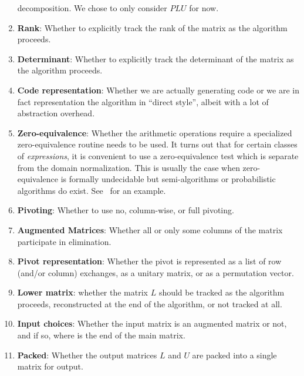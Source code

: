 \documentclass[draft]{elsart}
\begin{document}
\begin{enumerate}
		decomposition.  We chose to only consider $PLU$ for now.
	\item \textbf{Rank}: Whether to explicitly track the rank of the matrix
		as the algorithm proceeds.
	\item \textbf{Determinant}:  Whether to explicitly track the determinant
		of the matrix as the algorithm proceeds.
	\item \textbf{Code representation}: Whether we are actually generating
		code or we are in fact representation the algorithm in ``direct
		style'', albeit with a lot of abstraction overhead.
	\item \textbf{Zero-equivalence}: Whether the 
		arithmetic operations require a specialized zero-equivalence 
		routine needs to be used.  It turns out that for certain classes
		of \emph{expressions}, it is convenient to use a zero-equivalence
		test which is separate from the domain normalization.  This is
		usually the case when zero-equivalence is formally undecidable
		but semi-algorithms or probabilistic algorithms do exist.
		See~\cite{ZhCaJeMo06a} for an example.
    \item \textbf{Pivoting}: Whether to use no, 
        column-wise, or full pivoting.
    \item \textbf{Augmented Matrices}: Whether all or only some
      columns of the matrix participate in elimination.
	\item \textbf{Pivot representation}: Whether the pivot is represented
	  as a list of row (and/or column) exchanges, as a unitary matrix,
	  or as a permutation vector.
  \item \textbf{Lower matrix}: whether the matrix $L$ should be tracked
	  as the algorithm proceeds, reconstructed at the end of the
	  algorithm, or not tracked at all.
  \item \textbf{Input choices}: Whether the input matrix is an augmented
	  matrix or not, and if so, where is the end of the main matrix.
  \item \textbf{Packed}: Whether the output matrices $L$ and $U$ are
	  packed into a single matrix for output.
\setcounter{naspects}{\value{enumi}}
\end{enumerate}
\end{document}
